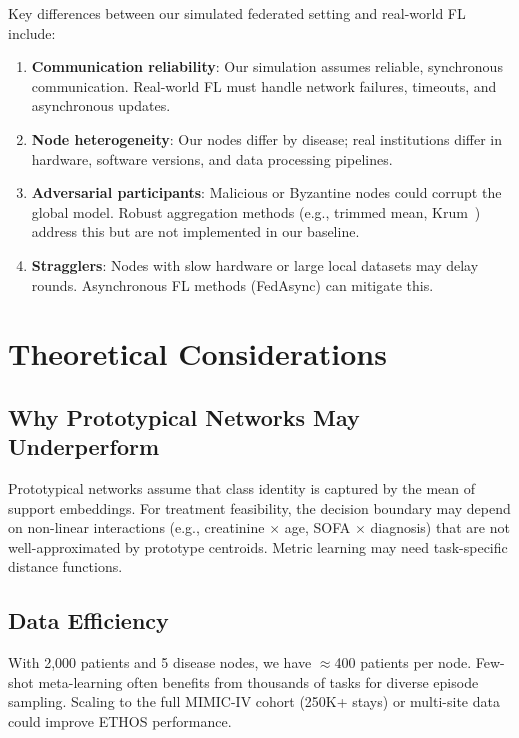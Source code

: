 Key differences between our simulated federated setting and real-world FL include:
\begin{enumerate}
\item \textbf{Communication reliability}: Our simulation assumes reliable, synchronous communication. Real-world FL must handle network failures, timeouts, and asynchronous updates.
\item \textbf{Node heterogeneity}: Our nodes differ by disease; real institutions differ in hardware, software versions, and data processing pipelines.
\item \textbf{Adversarial participants}: Malicious or Byzantine nodes could corrupt the global model. Robust aggregation methods (e.g., trimmed mean, Krum~\cite{blanchard2017machine}) address this but are not implemented in our baseline.
\item \textbf{Stragglers}: Nodes with slow hardware or large local datasets may delay rounds. Asynchronous FL methods (FedAsync) can mitigate this.
\end{enumerate}

\section{Theoretical Considerations}

\subsection{Why Prototypical Networks May Underperform}

Prototypical networks assume that class identity is captured by the mean of support embeddings. For treatment feasibility, the decision boundary may depend on non-linear interactions (e.g., creatinine $\times$ age, SOFA $\times$ diagnosis) that are not well-approximated by prototype centroids. Metric learning may need task-specific distance functions.

\subsection{Data Efficiency}

With 2,000 patients and 5 disease nodes, we have $\approx$400 patients per node. Few-shot meta-learning often benefits from thousands of tasks for diverse episode sampling. Scaling to the full MIMIC-IV cohort (250K+ stays) or multi-site data could improve ETHOS performance.

